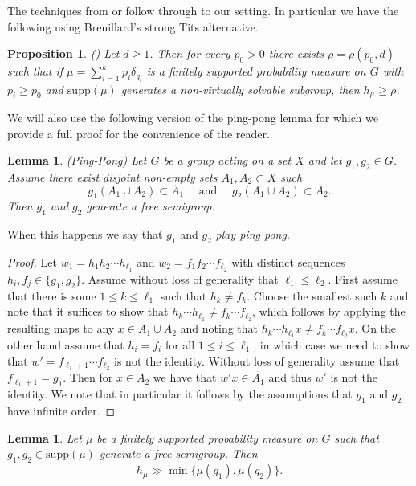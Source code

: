 \documentclass[10pt, english,oneside,reqno]{amsart}
\theoremstyle{plain}
\newtheorem{proposition}[theorem]{Proposition}
\newtheorem{lemma}[theorem]{Lemma}
\theoremstyle{remark}
\numberwithin{equation}{section}
\numberwithin{figure}{section}
\begin{document}
The techniques from \cite[Section 6.3]{HochmanSolomyak2017} or \cite[Section 9.2]{Kittle2023} follow through to our setting. In particular we have the following using Breuillard's strong Tits alternative. 

\begin{proposition} (\cite[Section 6.3]{HochmanSolomyak2017}) \label{EntropyFromTits}
    Let $d\geq 1$. Then for every $p_0 > 0$ there exists $\rho = \rho(p_0,d)$ such that if $\mu = \sum_{i = 1}^k p_i \delta_{g_i}$ is a finitely supported probability measure on $G$ with $p_i \geq p_0$ and $\mathrm{supp}(\mu)$ generates a non-virtually solvable subgroup, then $h_{\mu} \geq \rho$.
\end{proposition}

We will also use the following version of the ping-pong lemma for which we provide a full proof for the convenience of the reader.

\begin{lemma}(Ping-Pong) \label{lemm:ping_pong}
	Let $G$ be a group acting on a set $X$ and let $g_1, g_2 \in G$. Assume there exist disjoint non-empty sets $A_1, A_2 \subset X$ such $$g_1(A_1 \cup A_2) \subset A_1 \quad \text{ and } \quad g_2(A_1 \cup A_2) \subset A_2.$$ Then $g_1$ and $g_2$ generate a free semigroup.
\end{lemma}

When this happens we say that $g_1$ and $g_2$ \emph{play ping pong}.

\begin{proof}
	Let $w_1 = h_1h_2\cdots h_{\ell_1}$ and $w_2 = f_1f_2\cdots f_{\ell_2}$ with distinct sequences $h_i, f_j \in \{ g_1, g_2 \}$. Assume without loss of generality that $\ell_1 \leq \ell_2$. First assume that there is some $1 \leq k \leq \ell_1$ such that $h_k \neq f_k$. Choose the smallest such $k$ and note that it suffices to show that $h_k\cdots h_{\ell_1} \neq f_k\cdots f_{\ell_2}$, which follows by applying the resulting maps to any $x \in A_1 \cup A_2$ and noting that $h_k\cdots h_{\ell_1}x \neq f_k\cdots f_{\ell_2}x$. On the other hand assume that $h_i = f_i$ for all $1 \leq i \leq \ell_1$, in which case we need to show that $w' = f_{\ell_1 + 1}\cdots f_{\ell_2}$ is not the identity. Without loss of generality assume that $f_{\ell_1 + 1} = g_1$. Then for $x \in A_2$ we have that $w'x \in A_1$ and thus $w'$ is not the identity. We note that in particular it follows by the assumptions that $g_1$ and $g_2$ have infinite order.
\end{proof}

\begin{lemma}\label{lemm:FreeEntBound}
    Let $\mu$ be a finitely supported probability measure on $G$ such that $g_1, g_2 \in \mathrm{supp}(\mu)$ generate a free semigroup. Then $$h_{\mu} \gg  \min\{ \mu(g_1), \mu(g_2) \}.$$
\end{lemma}
\end{document}
